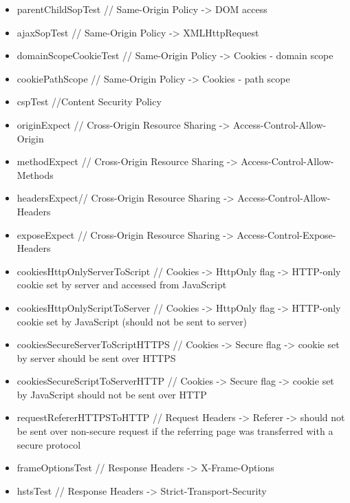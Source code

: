 \begin{itemize}
 \item parentChildSopTest // Same-Origin Policy -> DOM access
 \item ajaxSopTest // Same-Origin Policy -> XMLHttpRequest
 \item domainScopeCookieTest // Same-Origin Policy -> Cookies - domain scope
 \item cookiePathScope // Same-Origin Policy -> Cookies - path scope
 \item cspTest //Content Security Policy
 \item originExpect // Cross-Origin Resource Sharing -> Access-Control-Allow-Origin  
 \item methodExpect // Cross-Origin Resource Sharing -> Access-Control-Allow-Methods
 \item headersExpect// Cross-Origin Resource Sharing -> Access-Control-Allow-Headers
 \item exposeExpect // Cross-Origin Resource Sharing -> Access-Control-Expose-Headers
 \item cookiesHttpOnlyServerToScript // Cookies -> HttpOnly flag -> HTTP-only cookie set by server and accessed from JavaScript
 \item cookiesHttpOnlyScriptToServer  // Cookies -> HttpOnly flag -> HTTP-only cookie set by JavaScript (should not be sent to server)
 \item cookiesSecureServerToScriptHTTPS // Cookies -> Secure flag -> cookie set by server should be sent over HTTPS
 \item cookiesSecureScriptToServerHTTP // Cookies -> Secure flag -> cookie set by JavaScript should not be sent over HTTP
 \item requestRefererHTTPSToHTTP // Request Headers -> Referer -> should not be sent over non-secure request if the referring page was transferred with a secure protocol
 \item frameOptionsTest // Response Headers -> X-Frame-Options
 \item hstsTest // Response Headers -> Strict-Transport-Security
\end{itemize}
